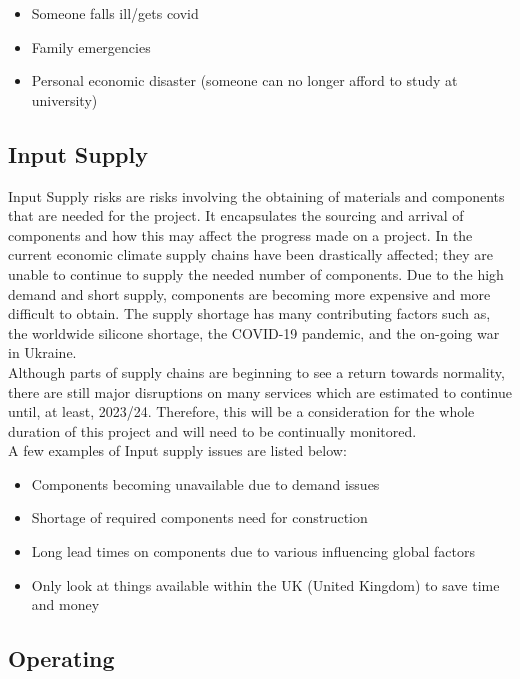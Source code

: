 \documentclass [12pt]{article}
\begin{document}
\begin{itemize}
    \item Someone falls ill/gets covid
    \item Family emergencies
    \item Personal economic disaster (someone can no longer afford to study at university)
\end{itemize}

\subsection{Input Supply}\label{sec:Input_Supply_Risk}

Input Supply risks are risks involving the obtaining of materials and components that are needed for the project. It encapsulates the sourcing and arrival of components and how this may affect the progress made on a project. In the current economic climate supply chains have been drastically affected; they are unable to continue to supply the needed number of components. Due to the high demand and short supply, components are becoming more expensive and more difficult to obtain. The supply shortage has many contributing factors such as, the worldwide silicone shortage, the COVID-19 pandemic, and the on-going war in Ukraine. 
\\
Although parts of supply chains are beginning to see a return towards normality, there are still major disruptions on many services which are estimated to continue until, at least, 2023/24. Therefore, this will be a consideration for the whole duration of this project and will need to be continually monitored.
\\
A few examples of Input supply issues are listed below:

\begin{itemize}
    \item Components becoming unavailable due to demand issues 
    \item Shortage of required components need for construction 
    \item Long lead times on components due to various influencing global factors 
    \item Only look at things available within the UK (United Kingdom) to save time and money
\end{itemize}

\subsection{Operating}\label{sec:Operating_Risk}
\end{document}
